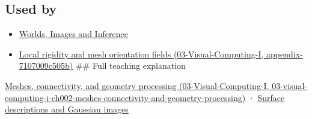 \subsection{Used by}\label{appendix-0234ab7f86b1-used-by}

\begin{itemize}
\item
  \href{Continuous\%20Notes/University\%20-\%20Worlds,\%20Images\%20and\%20Inference\%20-\%20Graphics,\%20Vision\%20and\%20Photography}{Worlds, Images and Inference}
\item
  \href{../03-Visual-Computing-I/main.pdf\#nameddest=appendix-7107009c505b}{Local rigidity and mesh orientation fields (03-Visual-Computing-I, appendix-7107009c505b)} \#\# Full teaching explanation
\end{itemize}

\href{../03-Visual-Computing-I/main.pdf\#nameddest=03-visual-computing-i-ch002-meshes-connectivity-and-geometry-processing}{Meshes, connectivity, and geometry processing (03-Visual-Computing-I, 03-visual-computing-i-ch002-meshes-connectivity-and-geometry-processing)} · \hyperref[04-visual-computing-ii-ch032-surface-descriptions-and-gaussian-images]{Surface descriptions and Gaussian images}
